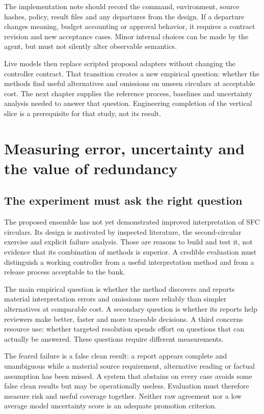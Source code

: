 \documentclass[12pt,a4paper,oneside,openany]{book}
\begin{document}
The implementation note should record the command, environment, source hashes,
policy, result files and any departures from the design. If a departure changes
meaning, budget accounting or approval behavior, it requires a contract revision
and new acceptance cases. Minor internal choices can be made by the agent, but
must not silently alter observable semantics.

Live models then replace scripted proposal adapters without changing the controller
contract. That transition creates a new empirical question: whether the methods
find useful alternatives and omissions on unseen circulars at acceptable cost.
The next chapter supplies the reference process, baselines and uncertainty
analysis needed to answer that question. Engineering completion of the vertical
slice is a prerequisite for that study, not its result.


\chapter{Measuring error, uncertainty and the value of redundancy}
\label{ch:evaluation}

\section{The experiment must ask the right question}
\label{merge:M09:00}


The proposed ensemble has not yet demonstrated improved interpretation of SFC
circulars. Its design is motivated by inspected literature, the second-circular
exercise and explicit failure analysis. Those are reasons to build and test it,
not evidence that its combination of methods is superior. A credible evaluation
must distinguish a working controller from a useful interpretation method and
from a release process acceptable to the bank.

The main empirical question is whether the method discovers and reports material
interpretation errors and omissions more reliably than simpler alternatives at
comparable cost. A secondary question is whether its reports help reviewers make
better, faster and more traceable decisions. A third concerns resource use:
whether targeted resolution spends effort on questions that can actually be
answered. These questions require different measurements.

The feared failure is a false clean result: a report appears complete and
unambiguous while a material source requirement, alternative reading or factual
assumption has been missed. A system that abstains on every case avoids some false
clean results but may be operationally useless. Evaluation must therefore measure
risk and useful coverage together. Neither raw agreement nor a low average model
uncertainty score is an adequate promotion criterion.
\end{document}
